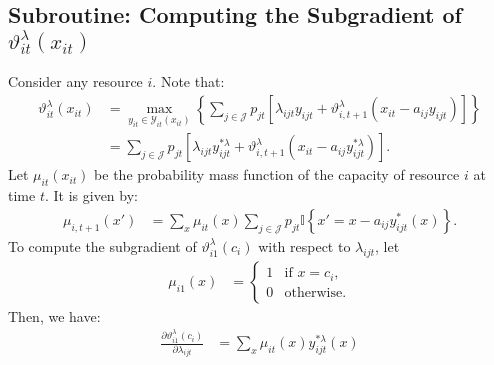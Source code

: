 \documentclass[11pt]{article}
\begin{document}
{\color{blue}



\subsection{Subroutine: Computing the Subgradient of $\vartheta^\lambda_{it}(x_{it})$}
\label{subroutine:computing_subgradient}

\noindent
Consider any resource $i$. 
Note that: 
\begin{align*}
    \vartheta^\lambda_{it}(x_{it}) 
    &= \max_{y_{it} \in \mathcal{Y}_{it}(x_{it})} 
    \left\{ 
        \sum_{j \in \mathcal{J}} p_{jt} 
        \left[ 
            \lambda_{ijt} y_{ijt} 
            + \vartheta^\lambda_{i, t+1}(x_{it} - a_{ij} y_{ijt}) 
        \right] 
    \right\} \\
    &= \sum_{j \in \mathcal{J}} p_{jt} 
        \left[ 
            \lambda_{ijt} y^{*\lambda}_{ijt} 
            + \vartheta^\lambda_{i, t+1}(x_{it} - a_{ij} y^{*\lambda}_{ijt}) 
        \right] . 
\end{align*}
Let \( \mu_{it}(x_{it}) \) be the probability mass function of the capacity of resource $i$ at time $t$. 
It is given by:
\begin{align*}
    \mu_{i,t+1}(x') &= \sum_{x} \mu_{it}(x) \sum_{j \in \mathcal{J}} p_{jt} \mathbb{I}\left\{x' = x - a_{ij}y_{ijt}^*(x)\right\} .
\end{align*}
To compute the subgradient of $\vartheta^\lambda_{i1}(c_{i})$ with respect to $\lambda_{ijt}$, let
\begin{align*}
    \mu_{i1}(x) &= 
        \begin{cases}
        1 & \text{if } x = c_i, \\
        0 & \text{otherwise.}
        \end{cases}
\end{align*}
Then, we have:
\begin{align*}
    \frac{\partial \vartheta^\lambda_{i1}(c_{i})}{\partial \lambda_{ijt}} 
    &= \sum_{x} \mu_{it}(x) y^{*\lambda}_{ijt}(x) 
\end{align*}

}
\end{document}
